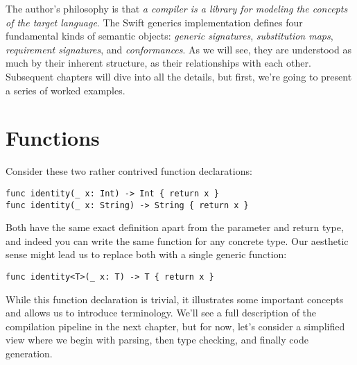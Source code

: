 \documentclass[../generics]{subfiles}
\begin{document}
The author's philosophy is that \textsl{a compiler is a library for modeling the concepts of the target language}. The Swift generics implementation defines four fundamental kinds of semantic objects: \emph{generic signatures}, \emph{substitution maps}, \emph{requirement signatures}, and \emph{conformances}. As we will see, they are understood as much by their inherent structure, as their relationships with each other. Subsequent chapters will dive into all the details, but first, we're going to present a series of worked examples.

\section{Functions}

Consider these two rather contrived function declarations:
\begin{Verbatim}
func identity(_ x: Int) -> Int { return x }
func identity(_ x: String) -> String { return x }
\end{Verbatim}
Both have the same exact definition apart from the parameter and return type, and indeed you can write the same function for any concrete type. Our aesthetic sense might lead us to replace both with a single generic function:
\begin{Verbatim}
func identity<T>(_ x: T) -> T { return x }
\end{Verbatim}
While this function declaration is trivial, it illustrates some important concepts and allows us to introduce terminology. We'll see a full description of the compilation pipeline in the next chapter, but for now, let's consider a simplified view where we begin with parsing, then type checking, and finally code generation.

\begin{figure}\label{identity ast}
\begin{center}
\end{center}
\end{figure}
\end{document}
